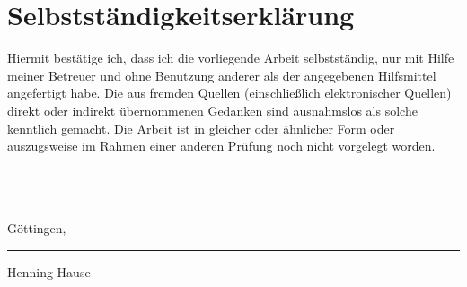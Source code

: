 \documentclass[12pt,a4paper]{article}
\theoremstyle{definition}
\theoremstyle{definition}
\theoremstyle{definition}
\theoremstyle{definition}
\begin{document}
\section*{Selbstständigkeitserklärung}
Hiermit bestätige ich, dass ich die vorliegende Arbeit selbstständig, nur mit Hilfe meiner Betreuer und ohne Benutzung anderer als der angegebenen Hilfsmittel angefertigt habe. Die aus fremden Quellen (einschließlich elektronischer Quellen) direkt oder indirekt übernommenen Gedanken sind ausnahmslos als solche kenntlich gemacht. Die Arbeit ist in gleicher oder ähnlicher Form oder auszugsweise im Rahmen einer anderen Prüfung noch nicht vorgelegt worden.
\\ \\ \\ \\
\parbox{5cm}{\centering Göttingen, }
\hfill\parbox{4cm}{\hrule \strut \centering  \footnotesize Henning Hause}
\end{document}
